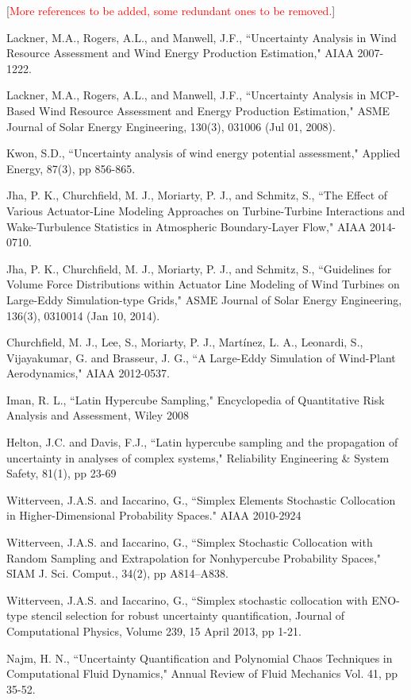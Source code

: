 \documentclass[]{aiaa-tc}%
\begin{document}
\begin{thebibliography}{9}%

[\textcolor{red}{More references to be added, some redundant ones to be removed.}]

Lackner, M.A., Rogers, A.L., and Manwell, J.F., ``Uncertainty Analysis in Wind Resource Assessment and Wind Energy Production Estimation," AIAA 2007-1222.

Lackner, M.A., Rogers, A.L., and Manwell, J.F., ``Uncertainty Analysis in MCP-Based Wind Resource Assessment and Energy Production Estimation," ASME Journal of Solar Energy Engineering, 130(3), 031006 (Jul 01, 2008).

Kwon, S.D., ``Uncertainty analysis of wind energy potential assessment," Applied Energy, 87(3), pp 856-865.

Jha, P. K., Churchfield, M. J., Moriarty, P. J., and Schmitz, S., ``The Effect of Various Actuator-Line   Modeling Approaches on Turbine-Turbine Interactions and Wake-Turbulence Statistics in Atmospheric Boundary-Layer Flow," AIAA 2014-0710.

Jha, P. K., Churchfield, M. J., Moriarty, P. J., and Schmitz, S., ``Guidelines for Volume Force  Distributions within Actuator Line Modeling of Wind Turbines on Large-Eddy Simulation-type Grids," ASME Journal of Solar Energy Engineering, 136(3), 0310014 (Jan 10, 2014).

Churchfield, M. J., Lee, S., Moriarty, P. J., Martínez, L. A., Leonardi, S., Vijayakumar, G. and  Brasseur, J. G., ``A Large-Eddy Simulation of Wind-Plant Aerodynamics," AIAA 2012-0537.

Iman, R. L., ``Latin Hypercube Sampling," Encyclopedia of Quantitative Risk Analysis and Assessment, Wiley 2008

Helton, J.C. and Davis, F.J., ``Latin hypercube sampling and the propagation of uncertainty in analyses of complex systems," Reliability Engineering \& System Safety, 81(1), pp 23-69

Witterveen, J.A.S. and Iaccarino, G., ``Simplex Elements Stochastic Collocation in Higher-Dimensional Probability Spaces." AIAA 2010-2924

Witterveen, J.A.S. and Iaccarino, G., ``Simplex Stochastic Collocation with Random Sampling and Extrapolation for Nonhypercube Probability Spaces," SIAM J. Sci. Comput., 34(2), pp A814–A838.

Witterveen, J.A.S. and Iaccarino, G., ``Simplex stochastic collocation with ENO-type stencil selection for robust uncertainty quantification, Journal of Computational Physics, Volume 239, 15 April 2013, pp 1-21.

Najm, H. N., ``Uncertainty Quantification and Polynomial Chaos Techniques in Computational Fluid Dynamics," Annual Review of Fluid Mechanics
Vol. 41, pp 35-52. 


\end{thebibliography}
\end{document}
